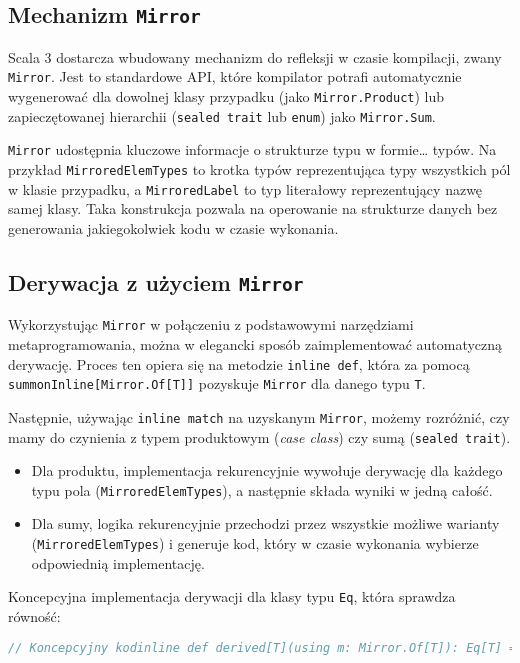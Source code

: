 \subsection{Mechanizm \texttt{Mirror}}
Scala 3 dostarcza wbudowany mechanizm do refleksji w czasie kompilacji, zwany \verb|Mirror|.
Jest to standardowe API, które kompilator potrafi automatycznie wygenerować dla dowolnej klasy przypadku (jako \verb|Mirror.Product|) lub zapieczętowanej hierarchii (\verb|sealed trait| lub \verb|enum|) jako \verb|Mirror.Sum|.

\verb|Mirror| udostępnia kluczowe informacje o strukturze typu w formie… typów.
Na przykład \verb|MirroredElemTypes| to krotka typów reprezentująca typy wszystkich pól w klasie przypadku, a \verb|MirroredLabel| to typ literałowy reprezentujący nazwę samej klasy.
Taka konstrukcja pozwala na operowanie na strukturze danych bez generowania jakiegokolwiek kodu w czasie wykonania.

\subsection{Derywacja z użyciem \texttt{Mirror}}
Wykorzystując \verb|Mirror| w połączeniu z podstawowymi narzędziami metaprogramowania, można w elegancki sposób zaimplementować automatyczną derywację.
Proces ten opiera się na metodzie \verb|inline def|, która za pomocą \verb|summonInline[Mirror.Of[T]]| pozyskuje \verb|Mirror| dla danego typu \verb|T|.

Następnie, używając \verb|inline match| na uzyskanym \verb|Mirror|, możemy rozróżnić, czy mamy do czynienia z typem produktowym (\emph{case class}) czy sumą (\verb|sealed trait|).
\begin{itemize}
    \item Dla produktu, implementacja rekurencyjnie wywołuje derywację dla każdego typu pola (\verb|MirroredElemTypes|), a następnie składa wyniki w jedną całość.
    \item Dla sumy, logika rekurencyjnie przechodzi przez wszystkie możliwe warianty (\verb|MirroredElemTypes|) i generuje kod, który w czasie wykonania wybierze odpowiednią implementację.
\end{itemize}

Koncepcyjna implementacja derywacji dla klasy typu \verb|Eq|, która sprawdza równość:
\begin{lstlisting}[language=Scala,caption={Koncepcyjny szkic derywacji Eq z użyciem Mirror},label={lst:eq-derived}]
// Koncepcyjny kodinline def derived[T](using m: Mirror.Of[T]): Eq[T] =  inline m match    case s: Mirror.SumOf[T] =>      // Logika dla sumy: sprawdź, który wariant i użyj jego instancji Eq      derivedSum(s)    case p: Mirror.ProductOf[T] =>      // Logika dla produktu: porównaj każde pole używając jego instancji Eq      derivedProduct(p)
\end{lstlisting}

